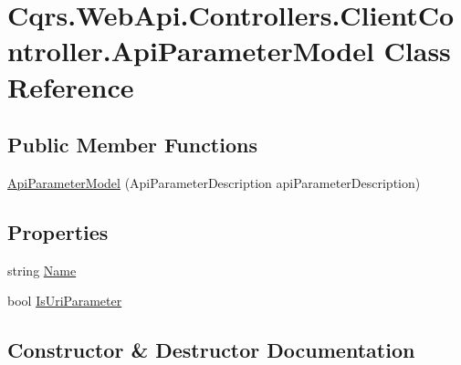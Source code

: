 \hypertarget{classCqrs_1_1WebApi_1_1Controllers_1_1ClientController_1_1ApiParameterModel}{}\section{Cqrs.\+Web\+Api.\+Controllers.\+Client\+Controller.\+Api\+Parameter\+Model Class Reference}
\label{classCqrs_1_1WebApi_1_1Controllers_1_1ClientController_1_1ApiParameterModel}
\subsection*{Public Member Functions}
\begin{DoxyCompactItemize}
\item 
\hyperlink{classCqrs_1_1WebApi_1_1Controllers_1_1ClientController_1_1ApiParameterModel_a10222cdb87160250e4722834d8ebda3b}{Api\+Parameter\+Model} (Api\+Parameter\+Description api\+Parameter\+Description)
\end{DoxyCompactItemize}
\subsection*{Properties}
\begin{DoxyCompactItemize}
\item 
string \hyperlink{classCqrs_1_1WebApi_1_1Controllers_1_1ClientController_1_1ApiParameterModel_a0677b50dfb8a3f7b2379d1af3424c7e7}{Name}
\item 
bool \hyperlink{classCqrs_1_1WebApi_1_1Controllers_1_1ClientController_1_1ApiParameterModel_a2c3f5b3bab3b0a77d49339496ba7c1c5}{Is\+Uri\+Parameter}
\end{DoxyCompactItemize}


\subsection{Constructor \& Destructor Documentation}
\mbox{\label{classCqrs_1_1WebApi_1_1Controllers_1_1ClientController_1_1ApiParameterModel_a10222cdb87160250e4722834d8ebda3b}} 
